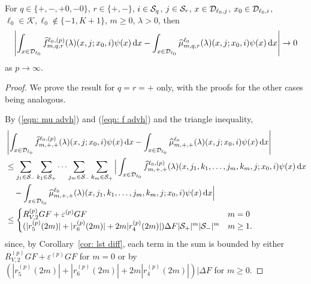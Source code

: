 \begin{cor}\label{cor: k}
	For \(q \in \{+,-,+0,-0\}\), \(r\in\{+,-\}\), \(i\in\mathcal{S}_q\), \(j\in\mathcal{S}_r\), \(x\in\mathcal{D}_{\ell_0,j}\), \(x_0\in\mathcal{D}_{\ell_0,i}\), \(\ell_0\in\mathcal K, \ell_0\notin\{-1,K+1\}\), \(m\geq 0\), \(\lambda > 0\), then 
	\begin{align}
		\left| \int_{x\in\mathcal{D}_{\ell_0}}\widehat f^{\ell_0,(p)}_{m,q,r}(\lambda)(x,j;x_0,i)\psi(x) \, \mathrm{d} x - \int_{x\in\mathcal{D}_{\ell_0}}\widehat \mu_{m,q,r}^{\ell_0}(\lambda)( x,j;x_0,i)\psi(x)\, \mathrm{d} x \right| \to 0 \label{eqnALKJV}
	\end{align}
	as \(p\to\infty\). 
\end{cor}
\begin{proof}
	We prove the result for \(q=r=+\) only, with the proofs for the other cases being analogous. 
	
	By (\ref{eqn: mu advh}) and (\ref{eqn: f advh}) and the triangle inequality, 
            \begin{align*}
            	&\left| \int_{x\in\mathcal{D}_{\ell_0}} \widehat f^{\ell_0,(p)}_{m,+,+}(\lambda)(x,j;x_0,i)\psi(x)\, \mathrm{d} x -  \int_{x\in\mathcal{D}_{\ell_0}} \widehat \mu^{\ell_0}_{m,+,+}(\lambda)(x,j;x_0,i)\psi(x)\, \mathrm{d} x\right|
		\\&\leq \sum_{j_1\in\mathcal S_-} \sum_{k_1\in\mathcal S_+}\dots \sum_{j_m\in\mathcal S_-}\sum_{k_m\in\mathcal S_+} \Big|  \int_{x\in\mathcal{D}_{\ell_0}} \widehat f^{\ell_0,(p)}_{m,+,+}(\lambda)( x, j_1,k_1,\dots,j_m,k_m, j; x_0,i) \psi(x)\, \mathrm{d} x
		\\&\quad{}- \int_{x\in\mathcal{D}_{\ell_0}} \widehat \mu^{\ell_0}_{m,+,+}(\lambda)( x, j_1,k_1,\dots,j_m,k_m, j; x_0,i)\psi(x)\, \mathrm{d} x \Big|
		\\&\leq  \begin{cases}
			R_{V,2}^{(p)} GF + \varepsilon^{(p)} GF & m = 0 \\
			(|r_5^{(p)}(2m)| + |r_6^{(p)}(2m)| + 2m|r_4^{(p)}(2m)|)\Delta F |\mathcal{S}_+|^m|\mathcal{S}_-|^m  &  m\geq 1.
			\end{cases}
        \end{align*}
         since, by Corollary~\ref{cor: lst diff}, each term in the sum is bounded by either \(R_{V,2}^{(p)} GF + \varepsilon^{(p)} GF\) for \(m=0\) or by \((|r_5^{(p)}(2m)| + |r_6^{(p)}(2m)| + 2m|r_4^{(p)}(2m)|)|\Delta F \) for \(m\geq 0\). 
\end{proof}

